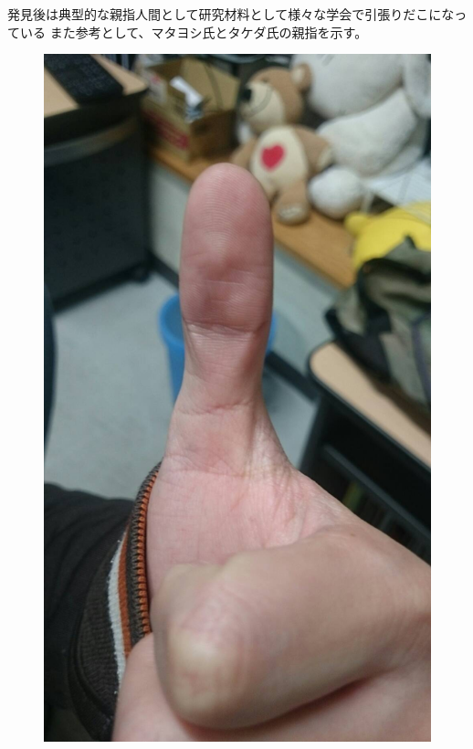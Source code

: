 \documentclass[12pt]{jsarticle}
\begin{document}
発見後は典型的な親指人間として研究材料として様々な学会で引張りだこになっている
また参考として、マタヨシ氏とタケダ氏の親指を示す。
\begin{figure}[htbp]
    \centering
  \begin{minipage}{0.4\linewidth}
    \centering
    \includegraphics[scale=0.15]{figure/matayo}
  \end{minipage}
  \begin{minipage}{0.4\linewidth}
    \centering

\end{minipage}
\end{figure}
\end{document}
